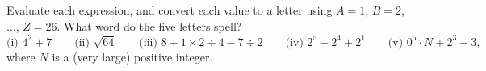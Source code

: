 Evaluate each expression, and convert each value to a letter using $A=1$, $B=2$, $\dots$, $Z=26$. What word do the five letters spell?
\[\text{(i) }4^2+7\qquad\text{(ii) }\sqrt{64}\qquad\text{(iii) }8+1\times2\div4-7\div2\qquad\text{(iv) }2^5-2^4+2^1\qquad\text{(v) }0^5\cdot N+2^3-3,\]
where $N$ is a (very large) positive integer.
